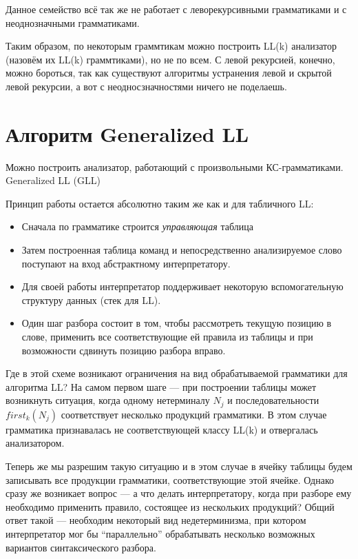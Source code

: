 Данное семейство всё так же не работает с леворекурсивными грамматиками и с неоднозначными грамматиками.

Таким образом, по некоторым граммтикам можно построить LL(k) анализатор (назовём их LL(k) граммтиками), но не по всем.
С левой рекурсией, конечно, можно бороться, так как существуют алгоритмы устранения левой и скрытой левой рекурсии, а вот с неодносзначностями ничего не поделаешь.



\section{Алгоритм Generalized LL}

Можно построить анализатор, работающий с произвольными КС-грамматиками.
Generalized LL (GLL)~\cite{Scott:2010:GP:1860132.1860320,10.1007/978-3-662-46663-6_5}

Принцип работы остается абсолютно таким же как и для табличного LL:
\begin{itemize}
  \item Сначала по грамматике строится \textit{управляющая} таблица
  \item Затем построенная таблица команд и непосредственно анализируемое слово поступают на вход абстрактному интерпретатору.
  \item Для своей работы интерпретатор поддерживает некоторую вспомогательную структуру данных (стек для LL).
  \item Один шаг разбора состоит в том, чтобы рассмотреть текущую позицию в слове, применить все соответствующие ей правила из таблицы и при возможности сдвинуть позицию разбора вправо.
\end{itemize}

Где в этой схеме возникают ограничения на вид обрабатываемой грамматики для алгоритма LL? На самом первом шаге --- при построении таблицы может возникнуть ситуация, когда одному нетерминалу $N_j$ и последовательности $first_k(N_j)$ соответствует несколько продукций грамматики. В этом случае грамматика признавалась не соответствующей классу LL(k) и отвергалась анализатором.

Теперь же мы разрешим такую ситуацию и в этом случае в ячейку таблицы будем записывать все продукции грамматики, соответствующие этой ячейке. Однако сразу же возникает вопрос --- а что делать интерпретатору, когда при разборе ему необходимо применить правило, состоящее из нескольких продукций? Общий ответ такой --- необходим некоторый вид недетерминизма, при котором интерпретатор мог бы ``параллельно'' обрабатывать несколько возможных вариантов синтаксического разбора.


